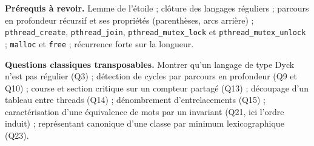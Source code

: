 \documentclass[11pt,a4paper]{article}
\begin{document}
\textbf{Prérequis à revoir.} Lemme de l'étoile ; clôture des langages réguliers ; parcours en profondeur récursif et ses propriétés (parenthèses, arcs arrière) ; \texttt{pthread\_create}, \texttt{pthread\_join}, \texttt{pthread\_mutex\_lock} et \texttt{pthread\_mutex\_unlock} ; \texttt{malloc} et \texttt{free} ; récurrence forte sur la longueur.

\textbf{Questions classiques transposables.} Montrer qu'un langage de type Dyck n'est pas régulier (Q3) ; détection de cycles par parcours en profondeur (Q9 et Q10) ; course et section critique sur un compteur partagé (Q13) ; découpage d'un tableau entre threads (Q14) ; dénombrement d'entrelacements (Q15) ; caractérisation d'une équivalence de mots par un invariant (Q21, ici l'ordre induit) ; représentant canonique d'une classe par minimum lexicographique (Q23).
\end{document}
